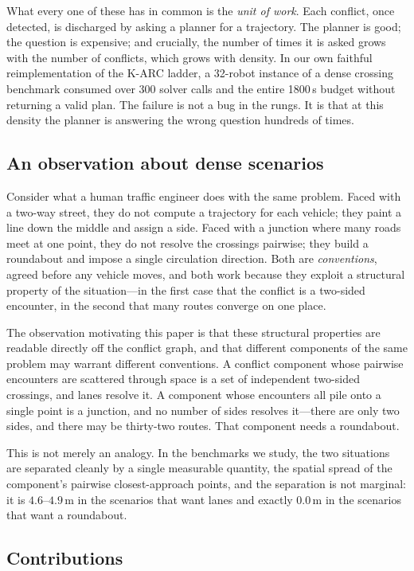 \documentclass[conference]{IEEEtran}
\begin{document}
What every one of these has in common is the \emph{unit of work}. Each conflict, once
detected, is discharged by asking a planner for a trajectory. The planner is good; the
question is expensive; and crucially, the number of times it is asked grows with the number
of conflicts, which grows with density. In our own faithful reimplementation of the K-ARC
ladder, a 32-robot instance of a dense crossing benchmark consumed over 300 solver calls
and the entire 1800\,s budget without returning a valid plan. The failure is not a bug in
the rungs. It is that at this density the planner is answering the wrong question hundreds
of times.

\subsection{An observation about dense scenarios}

Consider what a human traffic engineer does with the same problem. Faced with a two-way
street, they do not compute a trajectory for each vehicle; they paint a line down the
middle and assign a side. Faced with a junction where many roads meet at one point, they
do not resolve the crossings pairwise; they build a roundabout and impose a single
circulation direction. Both are \emph{conventions}, agreed before any vehicle moves, and
both work because they exploit a structural property of the situation---in the first case
that the conflict is a two-sided encounter, in the second that many routes converge on one
place.

The observation motivating this paper is that these structural properties are readable
directly off the conflict graph, and that different components of the same problem may
warrant different conventions. A conflict component whose pairwise encounters are scattered
through space is a set of independent two-sided crossings, and lanes resolve it. A
component whose encounters all pile onto a single point is a junction, and no number of
sides resolves it---there are only two sides, and there may be thirty-two routes. That
component needs a roundabout.

This is not merely an analogy. In the benchmarks we study, the two situations are separated
cleanly by a single measurable quantity, the spatial spread of the component's pairwise
closest-approach points, and the separation is not marginal: it is $4.6$--$4.9$\,m in the
scenarios that want lanes and exactly $0.0$\,m in the scenarios that want a roundabout.

\subsection{Contributions}
\end{document}
